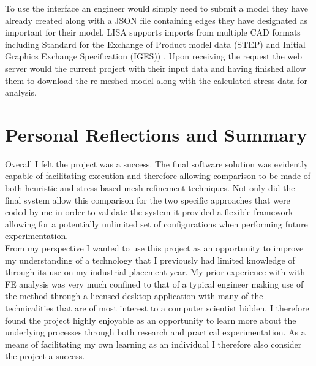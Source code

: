 \noindent
To use the interface an engineer would simply need to submit a model they have already created  along with a JSON file containing edges they have designated as important for their model. LISA supports imports from multiple CAD formats including Standard for the Exchange of Product model data (STEP) and Initial Graphics Exchange Specification (IGES)) \cite{LISAManual}. Upon receiving the request the web server would the current project with their input data and having finished allow them to download the re meshed model along with the calculated stress data for analysis.


\section{Personal Reflections and Summary}

\noindent
Overall I felt the project was a success. The final software solution was evidently capable of facilitating execution and therefore allowing comparison to be made of both heuristic and stress based mesh refinement techniques. Not only did the final system allow this comparison for the two specific approaches that were coded by me in order to validate the system it provided a flexible framework allowing for a potentially unlimited set of configurations when performing future experimentation. \\ 

\noindent
From my perspective I wanted to use this project as an opportunity to improve my understanding of a technology that I previously had limited knowledge of through its use on my industrial placement year. My prior experience with with FE analysis was very much confined to that of a typical engineer making use of the method through a licensed desktop application with many of the technicalities that are of most interest to a computer scientist hidden. I therefore found the project highly enjoyable as an opportunity to learn more about the underlying processes through both research and practical experimentation. As a means of facilitating my own learning as an individual I therefore also consider the project a success.

